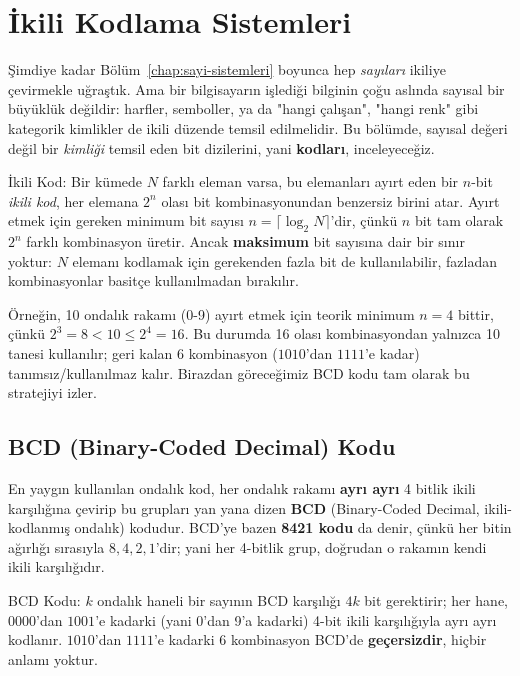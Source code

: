 \section{İkili Kodlama Sistemleri}
\label{sec:ikili-kodlar}

Şimdiye kadar Bölüm~\ref{chap:sayi-sistemleri} boyunca hep \emph{sayıları} ikiliye çevirmekle
uğraştık. Ama bir bilgisayarın işlediği bilginin çoğu aslında sayısal bir büyüklük değildir:
harfler, semboller, ya da "hangi çalışan", "hangi renk" gibi kategorik kimlikler de ikili
düzende temsil edilmelidir. Bu bölümde, sayısal değeri değil bir \emph{kimliği} temsil eden
bit dizilerini, yani \textbf{kodları}, inceleyeceğiz.

\begin{tanim}{İkili Kod:}
Bir kümede $N$ farklı eleman varsa, bu elemanları ayırt eden bir $n$-bit \emph{ikili kod},
her elemana $2^n$ olası bit kombinasyonundan benzersiz birini atar. Ayırt etmek için gereken
minimum bit sayısı $n=\lceil\log_2 N\rceil$'dir, çünkü $n$ bit tam olarak $2^n$ farklı
kombinasyon üretir. Ancak \textbf{maksimum} bit sayısına dair bir sınır yoktur: $N$ elemanı
kodlamak için gerekenden fazla bit de kullanılabilir, fazladan kombinasyonlar basitçe
kullanılmadan bırakılır.
\end{tanim}

Örneğin, 10 ondalık rakamı (0-9) ayırt etmek için teorik minimum $n=4$ bittir, çünkü
$2^3=8<10\le2^4=16$. Bu durumda 16 olası kombinasyondan yalnızca 10 tanesi kullanılır;
geri kalan 6 kombinasyon ($1010$'dan $1111$'e kadar) tanımsız/kullanılmaz kalır. Birazdan
göreceğimiz BCD kodu tam olarak bu stratejiyi izler.

\subsection{BCD (Binary-Coded Decimal) Kodu}
\label{sec:bcd}

En yaygın kullanılan ondalık kod, her ondalık rakamı \textbf{ayrı ayrı} 4 bitlik ikili
karşılığına çevirip bu grupları yan yana dizen \textbf{BCD} (Binary-Coded Decimal,
ikili-kodlanmış ondalık) kodudur. BCD'ye bazen \textbf{8421 kodu} da denir, çünkü her bitin
ağırlığı sırasıyla $8,4,2,1$'dir; yani her 4-bitlik grup, doğrudan o rakamın kendi ikili
karşılığıdır.

\begin{tanim}{BCD Kodu:}
$k$ ondalık haneli bir sayının BCD karşılığı $4k$ bit gerektirir; her hane, $0000$'dan
$1001$'e kadarki (yani 0'dan 9'a kadarki) 4-bit ikili karşılığıyla ayrı ayrı kodlanır.
$1010$'dan $1111$'e kadarki 6 kombinasyon BCD'de \textbf{geçersizdir}, hiçbir anlamı yoktur.
\end{tanim}

